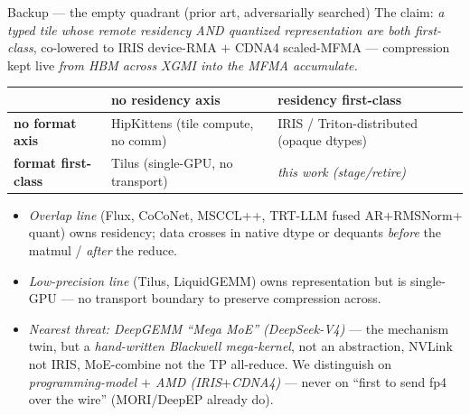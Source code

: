 \documentclass[pdf,aspectratio=169]{beamer}
\newcommand{\empy}[1]{{\color{darkorange}\emph{#1}}}
\newcommand{\empr}[1]{{\color{cardinalred}\emph{#1}}}
\newcommand{\mc}[1]{{\ttfamily\small #1}}
\begin{document}
\begin{frame}{Backup --- the empty quadrant (prior art, adversarially searched)}
\footnotesize
The claim: \empy{a typed tile whose remote residency AND quantized representation are both first-class}, co-lowered to IRIS device-RMA $+$ CDNA4 scaled-MFMA --- compression kept live \emph{from HBM across XGMI into the MFMA accumulate.}
\begin{center}
\scriptsize
\begin{tabular}{l l l}
\toprule
 & \textbf{no residency axis} & \textbf{residency first-class} \\
\midrule
\textbf{no format axis} & HipKittens (tile compute, no comm) & IRIS / Triton-distributed (opaque dtypes) \\
\textbf{format first-class} & Tilus (single-GPU, no transport) & \empr{this work (\mc{stage}/\mc{retire})} \\
\bottomrule
\end{tabular}
\end{center}
\begin{itemize}\scriptsize
  \item \empy{Overlap line} (Flux, CoCoNet, MSCCL++, TRT-LLM fused AR$+$RMSNorm$+$quant) owns residency; data crosses in native dtype or dequants \emph{before} the matmul / \emph{after} the reduce.
  \item \empy{Low-precision line} (Tilus, LiquidGEMM) owns representation but is single-GPU --- no transport boundary to preserve compression across.
  \item \empr{Nearest threat: DeepGEMM ``Mega MoE'' (DeepSeek-V4)} --- the mechanism twin, but a \emph{hand-written Blackwell mega-kernel}, not an abstraction, NVLink not IRIS, MoE-combine not the TP all-reduce. We distinguish on \empy{programming-model $+$ AMD (IRIS$+$CDNA4)} --- never on ``first to send fp4 over the wire'' (MORI/DeepEP already do).
\end{itemize}
\end{frame}
\end{document}

